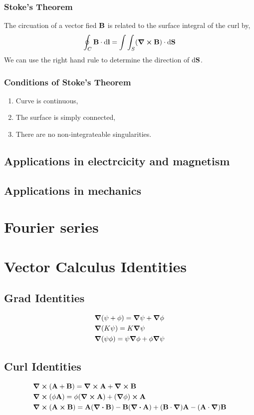 \documentclass{book}
\begin{document}
\subsection{Stoke's Theorem}
The circuation of a vector fied $\vb{B}$ is related to the surface integral of the curl by,
\begin{equation}
	\oint_C \vb{B}\cdot\dd{\vb{l}} = \int\int_S (\curl{\vb{B}})\cdot\dd{\vb{S}}
\end{equation}
We can use the right hand rule to determine the direction of $\dd{\vb{S}}$.
\subsection{Conditions of Stoke's Theorem}
\begin{enumerate}
	\item Curve is continuous,
	\item The surface is simply connected,
	\item There are no non-integrateable singularities.
\end{enumerate}
\section{Applications in electrcicity and magnetism}
\section{Applications in mechanics}
\chapter{Fourier series}
\appendix
\chapter{Vector Calculus Identities}
\section{Grad Identities}
\begin{align}
    & \grad(\psi + \phi) = \grad\psi + \grad\phi \\
    & \grad(K\psi) = K\grad\psi \\
    & \grad(\psi\phi) = \psi\grad\phi + \phi\grad\psi 
\end{align}
\section{Curl Identities}
\begin{align}
    & \curl{(\vb{A}+\vb{B})} = \curl{\vb{A}} + \curl{\vb{B}} \\
    & \curl{(\phi\vb{A})} = \phi(\curl{\vb{A}})+(\grad\phi)\cross\vb{A} \\
    & \curl{(\vb{A}\cross\vb{B})} = \vb{A}(\div{\vb{B}})-\vb{B}(\div{\vb{A}})+(\vb{B}\cdot\grad)\vb{A}-(\vb{A}\cdot\grad)\vb{B}
\end{align}
\end{document}
